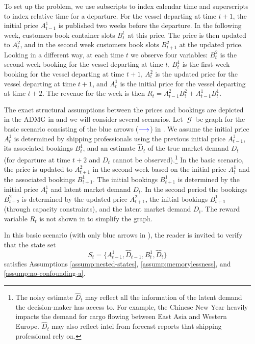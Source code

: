 \documentclass[12pt,a4paper]{article}
\theoremstyle{definition}
\DeclareMathOperator{\gG}{\mathscr{G}}
\begin{document}
To set up the problem, we use subscripts to index calendar time and
superscripts to index relative time for a departure. For the
vessel departing at time $t+1$, the initial price $A_{t-1}^1$ is
published two weeks before the departure. In the following week,
customers book container slots $B_t^1$ at this price. The price is
then updated to $A^2_t$, and in the second week customers book slots
$B^2_{t+1}$ at the updated price. Looking in a different way, at each
time $t$ we observe four variables: $B_t^2$
is the second-week booking for the vessel departing at time $t$,
$B_t^1$ is the first-week booking for the vessel departing at time
$t+1$, $A_t^2$ is the updated price for the vessel departing at
time $t+1$, and $A_t^1$ is the initial price for the vessel departing
at time $t+2$. The revenue for the week is then $R_t = A^2_{t-1}
B^2_{t} + A^1_{t-1} B^1_{t}$.

The exact structural assumptions between the prices and bookings are
depicted in the ADMG in  and we will
consider several scenarios. Let
$\gG$ be graph for the basic scenario consisting of the blue arrows
($\textcolor{graphBlue}{\longrightarrow}$) in
. We assume the initial price
$A^1_t$ is determined by shipping professionals using the previous
initial price $A^1_{t-1}$, its associated bookings $B^1_t$, and an
estimate $\hat{D}_t$ of the true market demand $D_t$ (for departure at
time $t+2$ and $D_t$ cannot be observed).\footnote{The noisy estimate
  $\hat{D}_t$ may reflect all
the information of the latent demand the decision-maker has access
to. For example, the Chinese New Year heavily impacts the demand for
cargo flowing between East Asia and Western Europe. $\hat{D}_t$ may
also reflect intel from forecast reports that shipping professional
rely on.} In the basic scenario, the
price is updated to
$A^2_{t+1}$ in the second week based on the initial price $A^1_t$ and
the associated bookings $B^1_{t+1}$. The initial bookings $B^1_{t+1}$ is
determined by the initial price $A^1_t$ and latent market demand
$D_t$. In the second period the bookings $B^2_{t+2}$ is determined
by the updated price $A^2_{t+1}$, the initial bookings $B^1_{t+1}$
(through capacity constraints), and the latent market demand
$D_t$. The reward variable $R_{t}$ is not shown in
 to simplify the graph.

In this basic scenario (with only blue arrows in
), the reader is invited to verify that the
state set
\begin{equation}\label{eq:dynamic_pricing_state}
  S_t = \{A^1_{t-1}, \hat{D}_{t-1}, B^1_t, \hat{D}_t\}
\end{equation}
satisfies Assumptions \ref{assump:nested-states},
\ref{assump:memorylessness}, and \ref{assump:no-confounding-a}.
\end{document}
